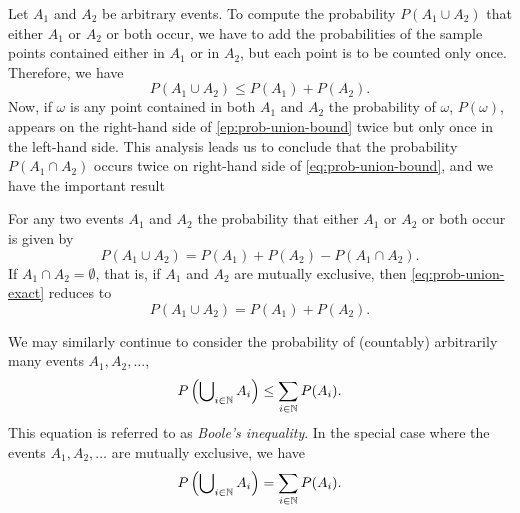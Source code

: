 Let \(A_1\) and \(A_2\) be arbitrary events. To compute the probability
\(P(A_1\cup A_2)\) that either \(A_1\) or \(A_2\) or both occur, we have to
add the probabilities of the sample points contained either in \(A_1\) or
in \(A_2\), but each point is to be counted only once. Therefore, we have
\begin{equation}
  \label{eq:prob-union-bound}
  P(A_1\cup A_2)\leq P(A_1)+P(A_2).
\end{equation}
Now, if \(\omega\) is any point contained in both \(A_1\) and \(A_2\) the
probability of \(\omega\), \(P(\omega)\), appears on the right-hand side of
\eqref{ep:prob-union-bound} twice but only once in the left-hand side. This
analysis leads us to conclude that the probability \(P(A_1\cap A_2)\)
occurs twice on right-hand side of \eqref{eq:prob-union-bound}, and we have
the important result
\begin{theorem}
  For any two events \(A_1\) and \(A_2\) the probability that either
  \(A_1\) or \(A_2\) or both occur is given by
  \begin{equation}
    \label{eq:prob-union-exact}
    P(A_1\cup A_2)=P(A_1)+P(A_2)-P(A_1\cap A_2).
  \end{equation}
  If \(A_1\cap A_2=\emptyset\), that is, if \(A_1\) and \(A_2\) are
  mutually exclusive, then \eqref{eq:prob-union-exact} reduces to
  \[
    P(A_1\cup A_2)=P(A_1)+P(A_2).
  \]
\end{theorem}

We may similarly continue to consider the probability of (countably)
arbitrarily many events \(A_1,A_2,\dotsc\),
\begin{equation}
  \label{eq:booles-inequality}
  P\left( \bigcup\nolimits_{i\in\mathbb{N}} A_i\right)\leq\sum_{i\in\mathbb{N}} P(A_i).
\end{equation}
This equation is referred to as \emph{Boole's inequality}. In the special
case where the events \(A_1,A_2,\dotsc\) are mutually exclusive, we have
\[
  P\left( \bigcup\nolimits_{i\in\mathbb{N}} A_i\right)=\sum_{i\in\mathbb{N}} P(A_i).
\]

